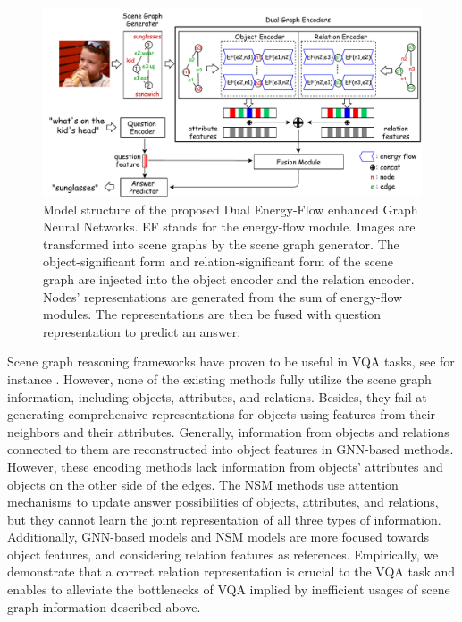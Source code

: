 \documentclass[letterpaper]{article} %
\begin{document}
\begin{figure}[ht] 
    \vspace{-0.5in}
    \centering 
    \includegraphics[width=1.0\textwidth]{./pic/DE-GNN.pdf} 
    \caption{Model structure of the proposed Dual Energy-Flow enhanced Graph Neural Networks. EF stands for the energy-flow module. Images are transformed into scene graphs by the scene graph generator. The object-significant form and relation-significant form of the scene graph are injected into the object encoder and the relation encoder. Nodes' representations are generated from the sum of energy-flow modules. The representations are then be fused with question representation to predict an answer.} 
    \label{fig2} 
\end{figure}


Scene graph reasoning frameworks have proven to be useful in VQA tasks, see for instance \cite{johnson2015image,DBLP:journals/corr/abs-2007-01072,yang2020prior}. 
However, none of the existing methods fully utilize the scene graph information, including objects, attributes, and relations.
Besides, they fail at generating comprehensive representations for objects using features from their neighbors and their attributes. 
Generally, information from objects and relations connected to them are reconstructed into object features in GNN-based methods.
However, these encoding methods lack information from objects' attributes and objects on the other side of the edges. 
The NSM methods use attention mechanisms to update answer possibilities of objects, attributes, and relations, but they cannot learn the joint representation of all three types of information. 
Additionally, GNN-based models and NSM models are more focused towards object features, and considering relation features as references. 
Empirically, we demonstrate that a correct relation representation is crucial to the VQA task and enables to alleviate the bottlenecks of VQA implied by inefficient usages of scene graph information described above.
\end{document}
